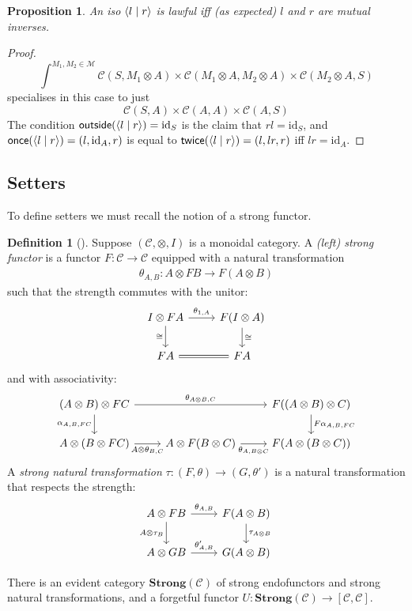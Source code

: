 \documentclass[11pt,a4paper]{article}
\theoremstyle{plain}
\newtheorem{proposition}[theorem]{Proposition}
\theoremstyle{definition}
\newtheorem{definition}[theorem]{Definition}
\newcommand{\C}{\mathscr{C}}
\newcommand{\M}{\mathscr{M}}
\newcommand{\Strong}{\mathbf{Strong}}
\newcommand{\id}{\mathrm{id}}
\newcommand{\rep}[2]{{\ensuremath \left\langle #1 \mid #2 \right\rangle}}
\newcommand{\outside}{\mathsf{outside}}
\newcommand{\once}{\mathsf{once}}
\newcommand{\twice}{\mathsf{twice}}
\begin{document}
\begin{proposition}
  An iso $\rep{l}{r}$ is lawful iff (as expected) $l$ and $r$ are mutual inverses.
\end{proposition}
\begin{proof}
  \[ \int^{M_1, M_2 \in \M} \C(S, M_1 \otimes A) \times \C(M_1 \otimes A, M_2 \otimes A) \times \C(M_2 \otimes A, S) \]
  specialises in this case to just
  \[ \C(S, A) \times \C(A, A) \times \C(A, S) \]
  The condition $\outside(\rep{l}{r }) = \id_S$ is the claim that $rl = \id_S$, and $\once(\rep{l}{r }) = (l, \id_A, r)$ is equal to $\twice(\rep{l}{r }) = (l, lr, r)$ iff $lr = \id_A$.
\end{proof}

\subsection{Setters}\label{sec:setters}

To define setters we must recall the notion of a strong functor.

\begin{definition}[\cite{StrongFunctors}]\label{def:strong-functor}
  Suppose $(\C, \otimes, I)$ is a monoidal category.  A \emph{(left) strong functor} is a functor $F : \C \to \C$ equipped with a natural transformation
  \begin{align*}
    \theta_{A,B} : A \otimes F B \to F(A \otimes B)
  \end{align*}
  such that the strength commutes with the unitor:
  \[
    \begin{tikzcd}
      I \otimes F A \ar[r, "\theta_{1,A}"] \ar[d, "\cong" left]  & F(I \otimes A) \ar[d, "\cong" right] \\
      F A \ar[r, equals] & F A
    \end{tikzcd}
  \]
  and with associativity:
  \[
    \begin{tikzcd}
      (A \otimes B) \otimes F C \ar[rr, "\theta_{A \otimes B, C}"] \ar[d, "\alpha_{A,B,FC}" left]  && F((A \otimes B) \otimes C) \ar[d, "F\alpha_{A,B,FC}" right] \\
      A \otimes (B \otimes F C) \ar[r, "A \otimes \theta_{B,C}" below] & A \otimes F(B \otimes C) \ar[r, "\theta_{A, B\otimes C}" below] & F(A \otimes (B \otimes C))
    \end{tikzcd}
  \]
  A \emph{strong natural transformation} $\tau : (F,\theta) \to (G,\theta')$ is a natural transformation that respects the strength:
  \[
    \begin{tikzcd}
      A \otimes F B \ar[r, "\theta_{A,B}"] \ar[d, "A \otimes \tau_B" left]  & F(A \otimes B) \ar[d, "\tau_{A \otimes B}" right] \\
      A \otimes G B \ar[r, "\theta'_{A, B}"]& G(A \otimes B)
    \end{tikzcd}
  \]

  There is an evident category $\Strong(\C)$ of strong endofunctors and strong natural transformations, and a forgetful functor $U : \Strong(\C) \to [\C, \C]$.
\end{definition}
\end{document}
